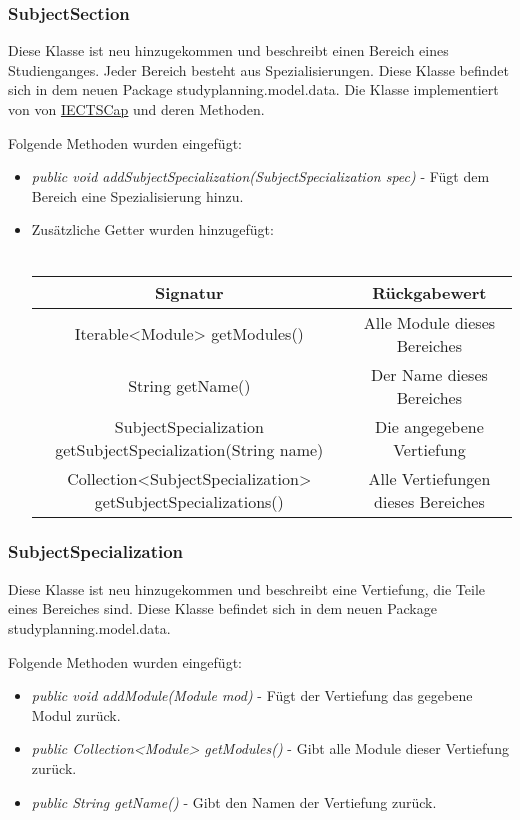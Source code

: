\documentclass[parskip=full]{scrartcl}
\begin{document}
			\subsubsection{SubjectSection}
				Diese Klasse ist neu hinzugekommen und beschreibt einen Bereich eines Studienganges. Jeder Bereich besteht aus Spezialisierungen. Diese Klasse befindet sich in dem neuen Package studyplanning.model.data.
				Die Klasse implementiert von von \hyperlink{model:IECTSCap}{IECTSCap} und deren Methoden.
			
				Folgende Methoden wurden eingefügt:
				\begin{itemize}
					\item \textit{public void addSubjectSpecialization(SubjectSpecialization spec)} - Fügt dem Bereich eine Spezialisierung hinzu.
					\item Zusätzliche Getter wurden hinzugefügt: 
					\\ \\
						\begin{tabular}{|c|c|}
							\hline 
							\textbf{Signatur} & \textbf{Rückgabewert} \\ 
							\hline 
							Iterable<Module> getModules() &  Alle Module dieses Bereiches \\ 
							String getName() &  Der Name dieses Bereiches \\ 
							SubjectSpecialization getSubjectSpecialization(String name) & Die angegebene Vertiefung \\ 
							Collection<SubjectSpecialization> getSubjectSpecializations() & Alle Vertiefungen dieses Bereiches\\
							\hline 
						\end{tabular} 
				\end{itemize}
			
			\subsubsection{SubjectSpecialization}
				Diese Klasse ist neu hinzugekommen und beschreibt eine Vertiefung, die Teile eines Bereiches sind. Diese Klasse befindet sich in dem neuen Package studyplanning.model.data.
				
				Folgende Methoden wurden eingefügt:
				\begin{itemize}
					\item \textit{public void addModule(Module mod)} - Fügt der Vertiefung das gegebene Modul zurück.
					\item \textit{public Collection<Module> getModules()} - Gibt alle Module dieser Vertiefung zurück.
					\item \textit{public String getName()} - Gibt den Namen der Vertiefung zurück.
				\end{itemize}
\end{document}
